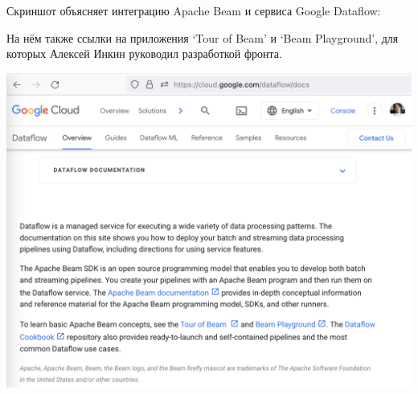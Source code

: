 
Скриншот объясняет интеграцию Apache Beam и сервиса Google Dataflow:


На нём также ссылки на приложения `Tour of Beam' и `Beam Playground',
для которых Алексей Инкин руководил разработкой фронта.

\includegraphics[width=\textwidth]{dataflow-docs}

\pagebreak
